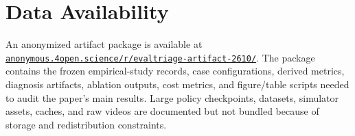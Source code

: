 \section*{Data Availability}

An anonymized artifact package is available at \href{https://anonymous.4open.science/r/evaltriage-artifact-2610/}{\nolinkurl{anonymous.4open.science/r/evaltriage-artifact-2610/}}. The package contains the frozen empirical-study records, case configurations, derived metrics, diagnosis artifacts, ablation outputs, cost metrics, and figure/table scripts needed to audit the paper's main results. Large policy checkpoints, datasets, simulator assets, caches, and raw videos are documented but not bundled because of storage and redistribution constraints.
